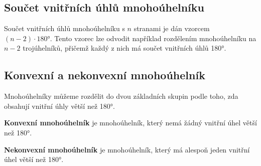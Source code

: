 \documentclass[12pt,a4paper]{article}
\begin{document}
\subsection{Součet vnitřních úhlů mnohoúhelníku}
Součet vnitřních úhlů mnohoúhelníku s $n$ stranami je dán vzorcem $(n-2) \cdot 180°$.
Tento vzorec lze odvodit například rozdělením mnohoúhelníku na $n-2$ trojúhelníků, přičemž každý z nich má součet vnitřních úhlů 180°.




\subsection{Konvexní a nekonvexní mnohoúhelník}
Mnohoúhelníky můžeme rozdělit do dvou základních skupin podle toho, zda obsahují vnitřní úhly větší než 180°.

\begin{definitionbox}
    \textbf{Konvexní mnohoúhelník} je mnohoúhelník, který nemá žádný vnitřní úhel větší než 180°.
\end{definitionbox}

\begin{definitionbox}
    \textbf{Nekonvexní mnohoúhelník} je mnohoúhelník, který má alespoň jeden vnitřní úhel větší než 180°.
\end{definitionbox}


\begin{center}
\end{center}
\end{document}
